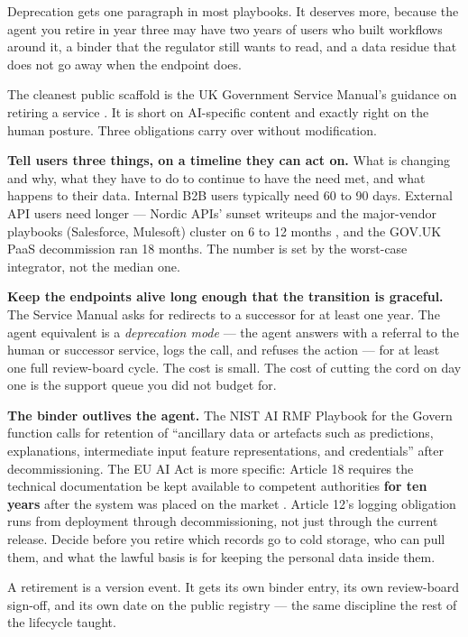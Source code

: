 Deprecation gets one paragraph in most playbooks. It deserves more, because the agent you retire in year three may have two years of users who built workflows around it, a binder that the regulator still wants to read, and a data residue that does not go away when the endpoint does.

The cleanest public scaffold is the UK Government Service Manual's guidance on retiring a service \citep{gds-retiring-service}. It is short on AI-specific content and exactly right on the human posture. Three obligations carry over without modification.

\textbf{Tell users three things, on a timeline they can act on.} What is changing and why, what they have to do to continue to have the need met, and what happens to their data. Internal B2B users typically need 60 to 90 days. External API users need longer --- Nordic APIs' sunset writeups and the major-vendor playbooks (Salesforce, Mulesoft) cluster on 6 to 12 months \citep{nordic-apis-sunset}, and the GOV.UK PaaS decommission ran 18 months. The number is set by the worst-case integrator, not the median one.

\textbf{Keep the endpoints alive long enough that the transition is graceful.} The Service Manual asks for redirects to a successor for at least one year. The agent equivalent is a \textit{deprecation mode} --- the agent answers with a referral to the human or successor service, logs the call, and refuses the action --- for at least one full review-board cycle. The cost is small. The cost of cutting the cord on day one is the support queue you did not budget for.

\textbf{The binder outlives the agent.} The NIST AI RMF Playbook for the Govern function \citep{nist-ai-rmf-playbook-govern} calls for retention of ``ancillary data or artefacts such as predictions, explanations, intermediate input feature representations, and credentials'' after decommissioning. The EU AI Act is more specific: Article 18 requires the technical documentation be kept available to competent authorities \textbf{for ten years} after the system was placed on the market \citep{euAIact2024}. Article 12's logging obligation runs from deployment through decommissioning, not just through the current release. Decide before you retire which records go to cold storage, who can pull them, and what the lawful basis is for keeping the personal data inside them.

A retirement is a version event. It gets its own binder entry, its own review-board sign-off, and its own date on the public registry --- the same discipline the rest of the lifecycle taught.

